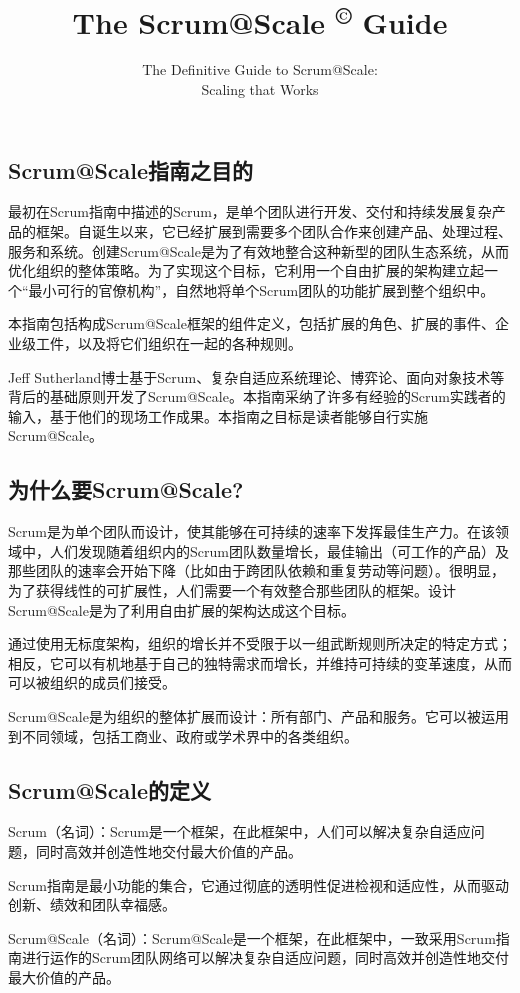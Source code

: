\documentclass[12pt,a4paper,parskip=full]{scrartcl}
\title{\Huge{\color{red}\textbf{The Scrum@Scale
\textsuperscript{\copyright}
Guide}}}
\subtitle{\color{gray}The Definitive Guide to Scrum@Scale:\\ Scaling that
Works}
\date{}
\begin{document}
\begin{CJK*}{UTF8}{gbsn}

\section{Scrum@Scale指南之目的}
最初在Scrum指南中描述的Scrum，是单个团队进行开发、交付和持续发展复杂产品的框架。自诞生以来，它已经扩展到需要多个团队合作来创建产品、处理过程、服务和系统。创建Scrum@Scale是为了有效地整合这种新型的团队生态系统，从而优化组织的整体策略。为了实现这个目标，它利用一个自由扩展的架构建立起一个“最小可行的官僚机构”，自然地将单个Scrum团队的功能扩展到整个组织中。

本指南包括构成Scrum@Scale框架的组件定义，包括扩展的角色、扩展的事件、企业级工件，以及将它们组织在一起的各种规则。

Jeff Sutherland博士基于Scrum、复杂自适应系统理论、博弈论、面向对象技术等背后的基础原则开发了Scrum@Scale。本指南采纳了许多有经验的Scrum实践者的输入，基于他们的现场工作成果。本指南之目标是读者能够自行实施Scrum@Scale。

\subsection{为什么要Scrum@Scale?}
Scrum是为单个团队而设计，使其能够在可持续的速率下发挥最佳生产力。在该领域中，人们发现随着组织内的Scrum团队数量增长，最佳输出（可工作的产品）及那些团队的速率会开始下降（比如由于跨团队依赖和重复劳动等问题）。很明显，为了获得线性的可扩展性，人们需要一个有效整合那些团队的框架。设计Scrum@Scale是为了利用自由扩展的架构达成这个目标。

通过使用无标度架构，组织的增长并不受限于以一组武断规则所决定的特定方式；相反，它可以有机地基于自己的独特需求而增长，并维持可持续的变革速度，从而可以被组织的成员们接受。

Scrum@Scale是为组织的整体扩展而设计：所有部门、产品和服务。它可以被运用到不同领域，包括工商业、政府或学术界中的各类组织。

\subsection{Scrum@Scale的定义}
Scrum（名词）：Scrum是一个框架，在此框架中，人们可以解决复杂自适应问题，同时高效并创造性地交付最大价值的产品。

Scrum指南是最小功能的集合，它通过彻底的透明性促进检视和适应性，从而驱动创新、绩效和团队幸福感。

Scrum@Scale（名词）：Scrum@Scale是一个框架，在此框架中，一致采用Scrum指南进行运作的Scrum团队网络可以解决复杂自适应问题，同时高效并创造性地交付最大价值的产品。


\end{CJK*}
\end{document}
